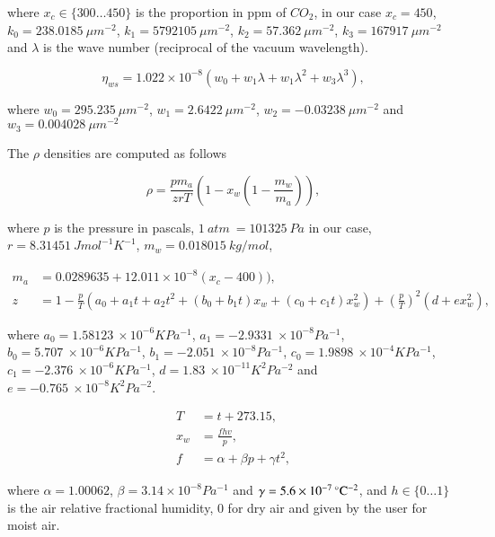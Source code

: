 where $x_c \in \lbrace 300 \ldots 450 \rbrace $ is the proportion in ppm of $CO_2$, in our case $x_c = 450$, $k_0 = 238.0185~\mu m^{-2}$, $k_1 = 5792105~\mu m^{-2}$, $k_2 = 57.362~\mu m^{-2}$, $k_3 = 167917~\mu m^{-2}$ and $\lambda$ is the wave number (reciprocal of the vacuum wavelength).

\begin{equation}
\label{eq:ciddor_eta_ws}
\eta_{ws} = 1.022 \times 10^{-8} \left( w_0 + w_1 \lambda + w_1 \lambda^2 + w_3 \lambda^3 \right),
\end{equation}

where $w_0 = 295.235~\mu m^{-2}$, $w_1 = 2.6422~\mu m^{-2}$, $w_2 = -0.03238~\mu m^{-2}$ and $w_3 = 0.004028~\mu m^{-2}$

The $\rho$ densities are computed as follows

\begin{equation}
\label{eq:ciddor_rho}
\rho =  \frac{p m_a}{zrT} \left( 1 - x_w \left(1 - \frac{m_w}{m_a} \right) \right), 
\end{equation}

where $p$ is the pressure in pascals, $1~atm~ = 101 325~Pa$ in our case, $r = 8.31451~J mol^{-1} K^{-1}$, $m_w = 0.018015~kg/mol$, 

\begin{align}
\label{eq:ciddor_m_a}
m_a &= 0.0289635 + 12.011 \times 10^{-8}(x_c - 400)),\\
\label{eq:ciddor_z}
z &= 1 - \frac{p}{T} \left(a_0 + a_1 t + a_2 t^2 + \left(b_0 + b_1 t \right) x_w + \left(c_0 + c_1 t \right) x_w^2 \right) + \left( \frac{p}{T} \right)^2 \left( d + ex_w^2 \right),
\end{align}

where $a_0 = 1.58123~\times 10 ^{-6} K Pa^{-1}$,  $a_1 =-2.9331 ~\times 10 ^{-8} Pa^{-1}$,  $b_0 = 5.707~\times 10 ^{-6} K Pa^{-1}$,  $b_1 = -2.051~\times 10 ^{-8} Pa^{-1}$,  $c_0 = 1.9898~\times 10 ^{-4} K Pa^{-1}$,  $c_1 = -2.376~\times 10 ^{-6} K Pa^{-1}$,  $d = 1.83~\times 10 ^{-11} K^2 Pa^{-2}$ and  $e = -0.765~\times 10 ^{-8} K^2 Pa^{-2}$.

\begin{align}
\label{eq:ciddor_t}
T &= t + 273.15, \\
\label{eq:ciddor_x_w}
x_w &= \frac{f h v}{ p}, \\
\label{eq:ciddor_f}
f &= \alpha + \beta p + \gamma t^2,
\end{align}

where $\alpha = 1.00062$, $\beta = 3.14 \times 10^{-8} Pa^{-1}$ and $\gamma = 5.6 \times 10^{-7} \,^{\circ}{\rm C}^{-2}$, and $h \in \lbrace 0 \ldots 1 \rbrace$ is the air relative fractional humidity, $0$ for dry air and given by the user for moist air.

